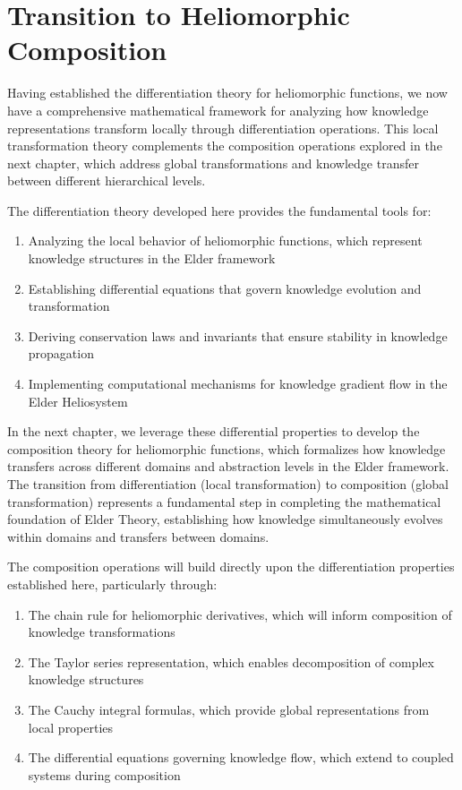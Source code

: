 \section{Transition to Heliomorphic Composition}

Having established the differentiation theory for heliomorphic functions, we now have a comprehensive mathematical framework for analyzing how knowledge representations transform locally through differentiation operations. This local transformation theory complements the composition operations explored in the next chapter, which address global transformations and knowledge transfer between different hierarchical levels.

The differentiation theory developed here provides the fundamental tools for:
\begin{enumerate}
    \item Analyzing the local behavior of heliomorphic functions, which represent knowledge structures in the Elder framework
    \item Establishing differential equations that govern knowledge evolution and transformation
    \item Deriving conservation laws and invariants that ensure stability in knowledge propagation
    \item Implementing computational mechanisms for knowledge gradient flow in the Elder Heliosystem
\end{enumerate}

In the next chapter, we leverage these differential properties to develop the composition theory for heliomorphic functions, which formalizes how knowledge transfers across different domains and abstraction levels in the Elder framework. The transition from differentiation (local transformation) to composition (global transformation) represents a fundamental step in completing the mathematical foundation of Elder Theory, establishing how knowledge simultaneously evolves within domains and transfers between domains.

The composition operations will build directly upon the differentiation properties established here, particularly through:
\begin{enumerate}
    \item The chain rule for heliomorphic derivatives, which will inform composition of knowledge transformations
    \item The Taylor series representation, which enables decomposition of complex knowledge structures
    \item The Cauchy integral formulas, which provide global representations from local properties
    \item The differential equations governing knowledge flow, which extend to coupled systems during composition
\end{enumerate}

